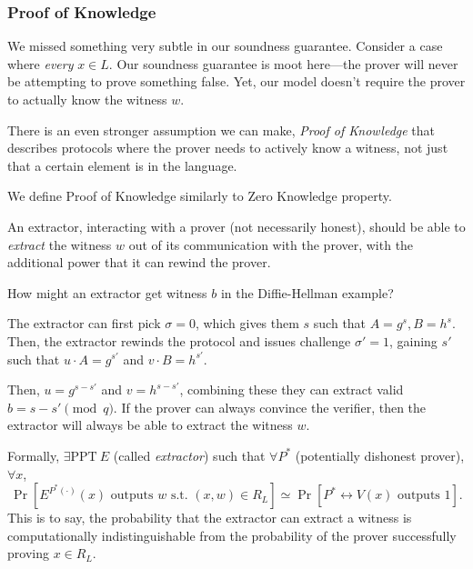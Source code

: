 \subsubsection{Proof of Knowledge}
We missed something very subtle in our soundness guarantee. Consider a case where \emph{every} $x\in L$. Our soundness guarantee is moot here---the prover will never be attempting to prove something false. Yet, our model doesn't require the prover to actually know the witness $w$.

There is an even stronger assumption we can make, \emph{Proof of Knowledge} that describes protocols where the prover needs to actively know a witness, not just that a certain element is in the language.

We define Proof of Knowledge similarly to Zero Knowledge property.


An extractor, interacting with a prover (not necessarily honest), should be able to \emph{extract} the witness $w$ out of its communication with the prover, with the additional power that it can rewind the prover.

\begin{example}
    How might an extractor get witness $b$ in the Diffie-Hellman example?


    The extractor can first pick $\sigma = 0$, which gives them $s$ such that $A = g^s, B = h^s$. Then, the extractor rewinds the protocol and issues challenge $\sigma' = 1$, gaining $s'$ such that $u\cdot A = g^{s'}$ and $v\cdot B = h^{s'}$.

    Then, $u = g^{s-s'}$ and $v = h^{s-s'}$, combining these they can extract valid $b = s-s'\pmod{q}$. If the prover can always convince the verifier, then the extractor will always be able to extract the witness $w$.
\end{example}

Formally, $\exists \mathrm{PPT}\ E$ (called \emph{extractor}) such that $\forall P^*$ (potentially dishonest prover), $\forall x$,
\[\Pr[E^{P^*(\cdot)}(x) \text{ outputs }w\text{ s.t. }(x, w)\in R_L] \simeq \Pr[P^*\leftrightarrow V(x)\text{ outputs }1].\]
This is to say, the probability that the extractor can extract a witness is computationally indistinguishable from the probability of the prover successfully proving $x\in R_L$.

